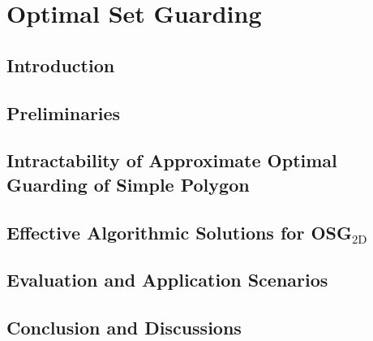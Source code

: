 
\chapter{Optimal Set Guarding}
\thispagestyle{myheadings}

\def\R{\mathbf{R}}
\def\C{\mathcal C}
\def\W{\mathcal W}

\def\opt{\textsc{OPT}\xspace}

\def\osgt{\textsc{OSG${}_{\mathrm{2D}}$}\xspace}

\def\opg{\textsc{OPG}\xspace}
\def\opgt{\textsc{OPG${}_{\mathrm{2D}}$}\xspace}
\def\orgt{\textsc{{ORG}${}_{\mathrm{2D}}$}\xspace}
\def\dopgt{\textsc{{D-OPG}${}_{\mathrm{2D}}$}\xspace}
\def\dorgt{\textsc{{D-ORG}${}_{\mathrm{2D}}$}\xspace}

\section{Introduction}\label{sec:osg-intro}


\section{Preliminaries}\label{sec:osg-problem}


\section{Intractability of Approximate Optimal Guarding of Simple Polygon}\label{sec:osg-complexity}


\section{Effective Algorithmic Solutions for \osgt}\label{sec:osg-algo}


\section{Evaluation and Application Scenarios}\label{sec:osg-expr}


\section{Conclusion and Discussions}\label{sec:osg-conc}

